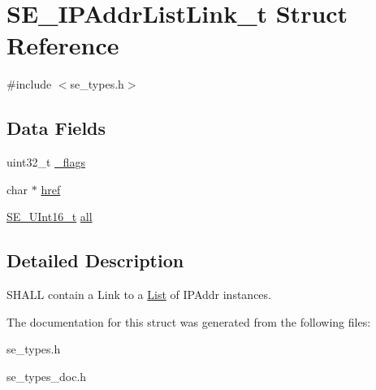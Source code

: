 \hypertarget{structSE__IPAddrListLink__t}{}\section{S\+E\+\_\+\+I\+P\+Addr\+List\+Link\+\_\+t Struct Reference}
\label{structSE__IPAddrListLink__t}


{\ttfamily \#include $<$se\+\_\+types.\+h$>$}

\subsection*{Data Fields}
\begin{DoxyCompactItemize}
\item 
uint32\+\_\+t \hyperlink{group__IPAddrListLink_ga0fc4d06150ae2ccf7a69b0f01763262b}{\+\_\+flags}
\item 
char $\ast$ \hyperlink{group__IPAddrListLink_gae02555e807312646921ccc931a552eef}{href}
\item 
\hyperlink{group__UInt16_gac68d541f189538bfd30cfaa712d20d29}{S\+E\+\_\+\+U\+Int16\+\_\+t} \hyperlink{group__IPAddrListLink_gabfb9db992e8d73c518bf1220efa6bbae}{all}
\end{DoxyCompactItemize}


\subsection{Detailed Description}
S\+H\+A\+LL contain a Link to a \hyperlink{structList}{List} of I\+P\+Addr instances. 

The documentation for this struct was generated from the following files\+:\begin{DoxyCompactItemize}
\item 
se\+\_\+types.\+h\item 
se\+\_\+types\+\_\+doc.\+h\end{DoxyCompactItemize}
